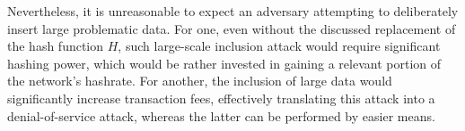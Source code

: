 \documentclass[a4paper,11pt,titlepage]{scrbook}
\begin{document}


Nevertheless, it is unreasonable to expect an adversary attempting to deliberately insert large problematic data.
For one, even without the discussed replacement of the hash function $H$, such large-scale inclusion attack would require significant hashing power, which would be rather invested in gaining a relevant portion of the network's hashrate.
For another, the inclusion of large data would significantly increase transaction fees, effectively translating this attack into a denial-of-service attack, whereas the latter can be performed by easier means.





\backmatter

\listoffigures
\cleardoublepage
{}
\listoftables
\end{document}
